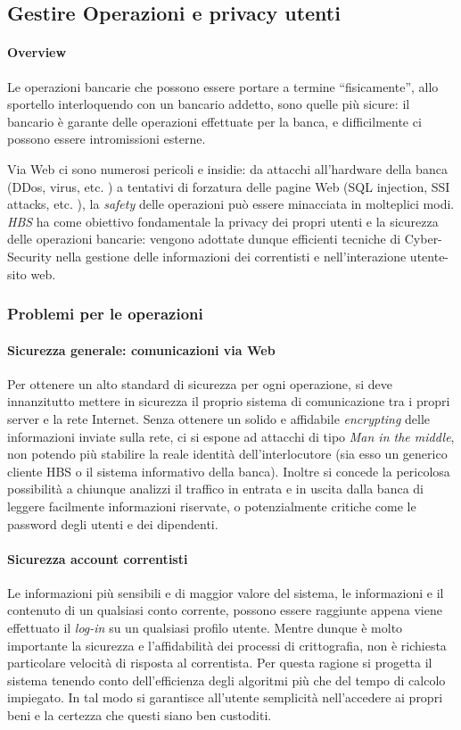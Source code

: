 \subsection{Gestire Operazioni e privacy utenti}

\paragraph{Overview} Le operazioni bancarie che possono essere portare a termine ``fisicamente'', allo sportello interloquendo con un bancario addetto, sono quelle più sicure: il bancario è garante delle operazioni effettuate per la banca, e difficilmente ci possono essere intromissioni esterne.

Via Web ci sono numerosi pericoli e insidie: da attacchi all'hardware della banca (DDos, virus, etc. ) a tentativi di forzatura delle pagine Web (SQL injection, SSI attacks, etc. ), la \emph{safety} delle operazioni può essere minacciata in molteplici modi.
\emph{HBS} ha come obiettivo fondamentale la privacy dei propri utenti e la sicurezza delle operazioni bancarie: vengono adottate dunque efficienti tecniche di Cyber-Security nella gestione delle informazioni dei correntisti e nell'interazione utente-sito web.

\subsubsection{Problemi per le operazioni}

\paragraph{Sicurezza generale: comunicazioni via Web}
Per ottenere un alto standard di sicurezza per ogni operazione, si deve innanzitutto mettere in sicurezza il proprio sistema di comunicazione tra i propri server e la rete Internet. Senza ottenere un solido e affidabile \emph{encrypting} delle informazioni inviate sulla rete, ci si espone ad attacchi di tipo \emph{Man in the middle}, non potendo più stabilire la reale identità dell'interlocutore (sia esso un generico cliente HBS o il sistema informativo della banca). Inoltre si concede la pericolosa possibilità a chiunque analizzi il traffico in entrata e in uscita dalla banca di leggere facilmente informazioni riservate, o potenzialmente critiche come le password degli utenti e dei dipendenti.


\paragraph{Sicurezza account correntisti}
Le informazioni più sensibili e di maggior valore del sistema, le informazioni e il contenuto di un qualsiasi conto corrente, possono essere raggiunte appena viene effettuato il \emph{log-in} su un qualsiasi profilo utente. Mentre dunque è molto importante la sicurezza e l'affidabilità dei processi di crittografia, non è richiesta particolare velocità di risposta al correntista. Per questa ragione si progetta il sistema tenendo conto dell'efficienza degli algoritmi più che del tempo di calcolo impiegato.
In tal modo si garantisce all'utente semplicità nell'accedere ai propri beni e la certezza che questi siano ben custoditi.


